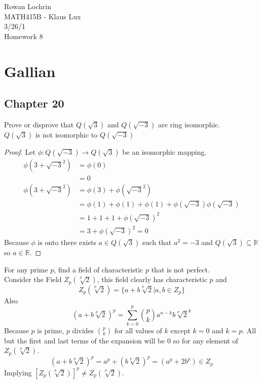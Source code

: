 \documentclass[11pt]{article}
\newcommand{\R}{\mathbb{R}}
\begin{document}
\begin{flushleft}
Rowan Lochrin \\
MATH415B - Klaus Lux \\
3/26/1 \\
Homework 8
\end{flushleft}

\section{Gallian}
\begin{description}
	\subsection{Chapter 20}
	\item[27] Prove or disprove that $Q(\sqrt{3})$ and $Q(\sqrt{-3})$ are ring
		isomorphic. \\
	$Q(\sqrt{3})$ is not isomorphic to  $Q(\sqrt{-3})$ 
		\begin{proof}
		Let $\phi:Q(\sqrt{-3}) \rightarrow Q(\sqrt{3}) $ be an
		isomorphic mapping.
		\begin{align*}
			\phi(3+\sqrt{-3}^2) & = \phi(0)\\
			& = 0\\
			\phi(3+\sqrt{-3}^2) & = \phi(3) + \phi(\sqrt{-3}^2)\\
				 & = \phi(1) + \phi(1) + \phi(1) +
				\phi(\sqrt{-3})\phi(\sqrt{-3}) \\
			 & = 1 + 1 + 1 + \phi(\sqrt{-3})^2 \\
			& = 3 + \phi(\sqrt{-3})^2 = 0 
		\end{align*}
		Because $\phi$ is onto there exists $a \in Q(\sqrt{3})$ such
		that  $a^2 = -3 $ and $Q(\sqrt{3}) \subseteq
		\R$ so  $a \in \R$.
		\end{proof}
	\item[28] For any prime $p$, find a field of characteristic $p$ that is
		not perfect. \\
		Consider the Field $Z_p(\sqrt[p]{2})$, this field clearly has
		characteristic $p$ and 
		$$ Z_p(\sqrt[p]{2}) = \{a+b\sqrt[p]{2}|a,b \in Z_p\}$$
		Also
		$$(a + b\sqrt[p]{2})^p = \sum_{k=0}^p\binom{p}{k} a^{n-k}b\sqrt[p]{2}^k$$
		Because $p$ is prime, $p$ divides $\binom{p}{k}$ for all
		values of $k$ except $k = 0$ and $k = p$. All but the first and
		last terms of the expansion will be 0 so for any element of
		$Z_p(\sqrt[p]{2})$.
		$$(a + b\sqrt[p]{2})^p = a^p + (b\sqrt[p]{2})^p = (a^p +2b^p) \in
		Z_p$$
		Implying $ [Z_p(\sqrt[p]{2})]^p \neq  Z_p(\sqrt[p]{2})$.

\end{description}
\end{document}
